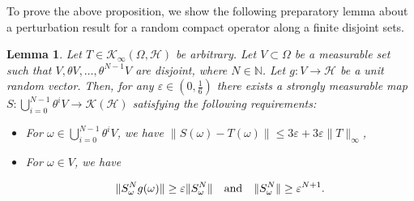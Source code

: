 \documentclass[pdflatex,sn-mathphys-num]{sn-jnl}%
\theoremstyle{thmstyleone}%
\theoremstyle{thmstyletwo}%
\newtheorem{lemma}{Lemma}
\theoremstyle{thmstylethree}%
\newcommand{\cH}{\mathcal{H}}
\newcommand{\cK}{\mathcal{K}}
\newcommand{\eps}{\varepsilon}
\numberwithin{equation}{section}
\begin{document}
To prove the above proposition, we show the following preparatory lemma about a perturbation result for a random compact operator along a finite disjoint sets.
%
%
\begin{lemma}\label{Perturbationalongashortperiod}
Let $T\in\cK_{\infty}(\Omega,\cH)$ be arbitrary. Let $V\subset \Omega$ be a measurable set such that $V,\theta V,\dots, \theta^{N-1} V$ are disjoint, where $N\in \mathbb N$.  Let $g: V\rightarrow \cH$ be a unit random vector. Then, for any $\eps\in (0,\frac{1}{6})$ there exists a strongly measurable map $S:\bigcup_{i=0}^{N-1} \theta^i V\rightarrow \mathcal K(\mathcal H)$ satisfying the following requirements:
\begin{itemize}
\item [(r1)] For $\omega\in \bigcup_{i=0}^{N-1} \theta^i V$, we have $\|S(\omega)-T(\omega)\|\leq 3\eps + 3\eps \|T\|_{\infty}$, 

\item [(r2)] For $\omega\in V$, we have 
 
\begin{equation}\label{Smallgrowth}
 \|S_{\omega}^N g(\omega)\|\geq \eps \|S_{\omega}^N\|\quad\hbox{and}  \quad \|S_{\omega}^N\|\geq \eps^{N+1}.
\end{equation}
\end{itemize}
\end{lemma}
\end{document}
